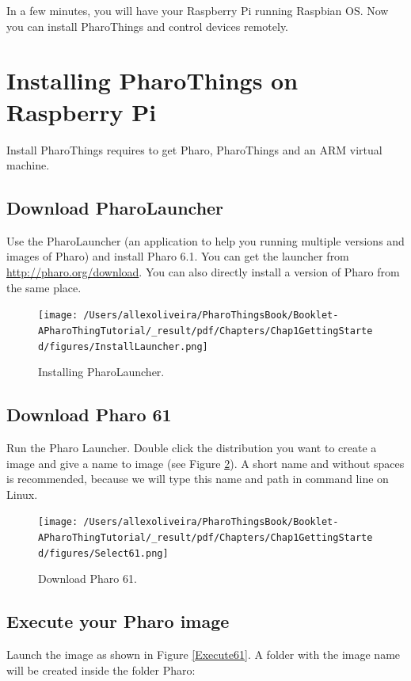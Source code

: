 \documentclass[10pt,twoside,english]{_support/latex/sbabook/sbabook}
\begin{document}
In a few minutes, you will have your Raspberry Pi running Raspbian OS.
Now you can install PharoThings and control devices remotely. 
\section{Installing PharoThings on Raspberry Pi}
Install PharoThings requires to get Pharo, PharoThings and an ARM virtual machine. 
\subsection{Download PharoLauncher}
Use the PharoLauncher (an application to help you running multiple versions and images of Pharo) and install Pharo 6.1. You can get the launcher from \url{http://pharo.org/download}.
You can also directly install a version of Pharo from the same place.


\begin{figure}

\begin{center}
\texttt{[image: /Users/allexoliveira/PharoThingsBook/Booklet-APharoThingTutorial/\_result/pdf/Chapters/Chap1GettingStarted/figures/InstallLauncher.png]}\caption{Installing PharoLauncher.\label{installLauncher}}\end{center}
\end{figure}

\subsection{Download Pharo 61}
Run the Pharo Launcher. Double click the distribution you want to create a image and give a name to image (see Figure \ref{InstallPharo61}). A short name and without spaces is recommended, because we will type this name and path in command line on Linux. 


\begin{figure}

\begin{center}
\texttt{[image: /Users/allexoliveira/PharoThingsBook/Booklet-APharoThingTutorial/\_result/pdf/Chapters/Chap1GettingStarted/figures/Select61.png]}\caption{Download Pharo 61.\label{InstallPharo61}}\end{center}
\end{figure}

\subsection{Execute your Pharo image}
Launch the image as shown in Figure \ref{Execute61}. A folder with the image name will be created inside the folder Pharo:  
\end{document}
